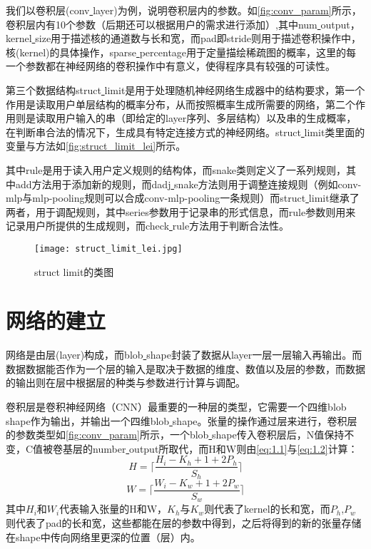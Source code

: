 我们以卷积层(conv\underline{ }layer)为例，说明卷积层内的参数。如\autoref{fig:conv_param}所示，卷积层内有10个参数（后期还可以根据用户的需求进行添加）,其中num\underline{ }output，kernel\underline{ }size用于描述核的通道数与长和宽，而pad即stride则用于描述卷积操作中，核(kernel)的具体操作，sparse\underline{ }percentage用于定量描绘稀疏图的概率，这里的每一个参数都在神经网络的卷积操作中有意义，使得程序具有较强的可读性。

第三个数据结构struct\underline{ }limit是用于处理随机神经网络生成器中的结构要求，第一个作用是读取用户单层结构的概率分布，从而按照概率生成所需要的网络，第二个作用则是读取用户输入的串（即给定的layer序列、多层结构）以及串的生成概率，在判断串合法的情况下，生成具有特定连接方式的神经网络。struct\underline{ }limit类里面的变量与方法如\autoref{fig:struct_limit_lei}所示。

其中rule是用于读入用户定义规则的结构体，而snake类则定义了一系列规则，其中add方法用于添加新的规则，而dadj\underline{ }snake方法则用于调整连接规则（例如conv-mlp与mlp-pooling规则可以合成conv-mlp-pooling一条规则）而struct\underline{ }limit继承了两者，用于调配规则，其中series参数用于记录串的形式信息，而rule参数则用来记录用户所提供的生成规则，而check\underline{ }rule方法用于判断合法性。

\begin{figure}[!htbp]
\centering
\texttt{[image: struct\_limit\_lei.jpg]}
\caption{struct limit的类图}
\label{fig:struct_limit_lei}
\end{figure}

\section{网络的建立}
网络是由层(layer)构成，而blob\underline{ }shape封装了数据从layer一层一层输入再输出。而数据数据能否作为一个层的输入是取决于数据的维度、数值以及层的参数，而数据的输出则在层中根据层的种类与参数进行计算与调配。

卷积层是卷积神经网络（CNN）最重要的一种层的类型，它需要一个四维blob\underline{ }shape作为输出，并输出一个四维blob\underline{ }shape。张量的操作通过层来进行，卷积层的参数类型如\autoref{fig:conv_param}所示，一个blob\underline{ }shape传入卷积层后，N值保持不变，C值被卷基层的number\underline{ }output所取代，而H和W则由\autoref{eq:1.1}与\autoref{eq:1.2}计算：
\begin{equation}\label{eq:1.1}
H=\lceil \frac{H_{i}-K_h+1+2P_{h}}{S_{h}}\rceil
\end{equation}
\begin{equation}\label{eq:1.2}
W=\lceil \frac{W_{i}-K_w+1+2P_{w}}{S_{w}}\rceil
\end{equation}
其中$H_{i}$和$W_{i}$代表输入张量的H和W，$K_h$与$K_w$则代表了kernel的长和宽，而$P_h$,$P_w$则代表了pad的长和宽，这些都能在层的参数中得到，之后将得到的新的张量存储在shape中传向网络里更深的位置（层）内。

